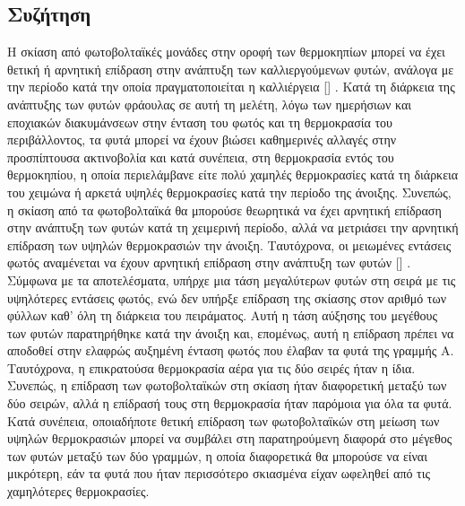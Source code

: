 \documentclass[12pt, a4paper]{report} %
\DeclareRobustCommand{\lcitep}[1]{%
  \english{[\cite{#1}]}%
}
\newcommand{\english}{\foreignlanguage{english}}
\begin{document}
\subsection{Συζήτηση}\label{sub_str_disc}
Η σκίαση από φωτοβολταϊκές μονάδες στην οροφή των θερμοκηπίων μπορεί να έχει θετική ή αρνητική επίδραση στην 
ανάπτυξη των καλλιεργούμενων φυτών, ανάλογα με την περίοδο κατά την οποία πραγματοποιείται η καλλιέργεια 
\lcitep{eisagwgi_str_bib34,strawberries_bib20,strawberries_bib21}. Κατά τη διάρκεια της ανάπτυξης των φυτών φράουλας σε 
αυτή τη μελέτη, λόγω των ημερήσιων και εποχιακών διακυμάνσεων στην ένταση του φωτός και τη θερμοκρασία του περιβάλλοντος, 
τα φυτά μπορεί να έχουν βιώσει καθημερινές αλλαγές στην προσπίπτουσα ακτινοβολία και κατά συνέπεια, στη θερμοκρασία εντός 
του θερμοκηπίου, η οποία περιελάμβανε είτε πολύ χαμηλές θερμοκρασίες κατά τη διάρκεια του χειμώνα ή αρκετά υψηλές 
θερμοκρασίες κατά την περίοδο της άνοιξης. Συνεπώς, η σκίαση από τα φωτοβολταϊκά θα μπορούσε θεωρητικά να έχει αρνητική 
επίδραση στην ανάπτυξη των φυτών κατά τη χειμερινή περίοδο, αλλά να μετριάσει την αρνητική επίδραση των υψηλών θερμοκρασιών 
την άνοιξη. Ταυτόχρονα, οι μειωμένες εντάσεις φωτός αναμένεται να έχουν αρνητική επίδραση στην ανάπτυξη των φυτών 
\lcitep{eisagwgi_str_bib45}. Σύμφωνα με τα αποτελέσματα, υπήρχε μια τάση μεγαλύτερων φυτών στη σειρά με τις υψηλότερες 
εντάσεις φωτός, ενώ δεν υπήρξε επίδραση της σκίασης στον αριθμό των φύλλων καθ’ όλη τη διάρκεια του πειράματος. Αυτή η 
τάση αύξησης του μεγέθους των φυτών παρατηρήθηκε κατά την άνοιξη και, επομένως, αυτή η επίδραση πρέπει να αποδοθεί στην 
ελαφρώς αυξημένη ένταση φωτός που έλαβαν τα φυτά της γραμμής Α. Ταυτόχρονα, η επικρατούσα θερμοκρασία αέρα για τις δύο 
σειρές ήταν η ίδια. Συνεπώς, η επίδραση των φωτοβολταϊκών στη σκίαση ήταν διαφορετική μεταξύ των δύο σειρών, αλλά η 
επίδρασή τους στη θερμοκρασία ήταν παρόμοια για όλα τα φυτά. Κατά συνέπεια, οποιαδήποτε θετική επίδραση των φωτοβολταϊκών 
στη μείωση των υψηλών θερμοκρασιών μπορεί να συμβάλει στη παρατηρούμενη διαφορά στο μέγεθος των φυτών μεταξύ των δύο γραμμών, 
η οποία διαφορετικά θα μπορούσε να είναι μικρότερη, εάν τα φυτά που ήταν περισσότερο σκιασμένα είχαν ωφεληθεί από τις 
χαμηλότερες θερμοκρασίες.
\end{document}
